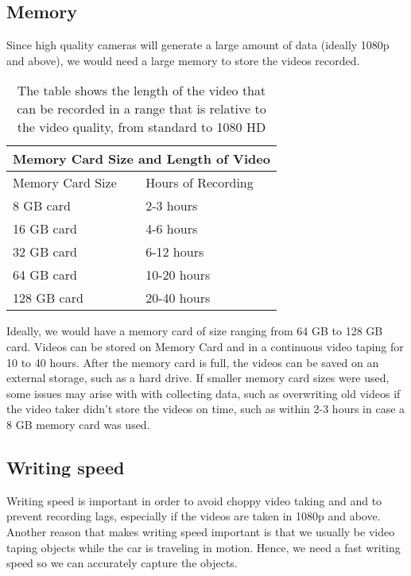 \documentclass[10pt,draftclsnofoot,onecolumn,journal,compsoc]{IEEEtran}
\begin{document}
\subsection{Memory}
Since high quality cameras will generate a large amount of data (ideally 1080p and above), we would need a large memory to store the videos recorded.

\captionsetup{justification=centering}
\begin{table}[htp]
\begin{center}
\centering
\begin{tabular}{|p{3cm}||p{3cm}|}
 \hline
 \multicolumn{2}{|c|}{Memory Card Size and Length of Video}\\
 \hline
 Memory Card Size & Hours of Recording\\
 \hline
 8 GB card & 2-3 hours\\
 16 GB card & 4-6 hours\\
32 GB card & 6-12 hours \\
64 GB card & 10-20 hours\\
128 GB card & 20-40 hours\\
 \hline
\end{tabular}
\caption{The table shows the length of the video that can be recorded in a range that is relative to the video quality, from standard to 1080 HD}
\end{center}
\end{table}

Ideally, we would have a memory card of size ranging from 64 GB to 128 GB card. Videos can be stored on Memory Card and in a continuous video taping for 10 to 40 hours. After the memory card is full, the videos can be saved on an external storage, such as a hard drive. If smaller memory card sizes were used, some issues may arise with with collecting data, such as overwriting old videos if the video taker didn’t store the videos on time, such as within 2-3 hours in case a 8 GB memory card was used.

\subsection{Writing speed}
Writing speed is important in order to avoid choppy video taking and and to prevent recording lags, especially if the videos are taken in 1080p and above. Another reason that makes writing speed important is that we usually be video taping objects while the car is traveling in motion. Hence, we need a fast writing speed so we can accurately capture the objects.
\end{document}
